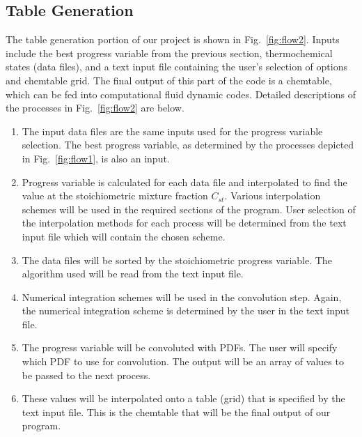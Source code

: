 \documentclass[11pt]{article}
\begin{document}
 
\subsection{Table Generation}
The table generation portion of our project is shown in
Fig.~\ref{fig:flow2}.  Inputs include the best progress variable from
the previous section, thermochemical states (data files), and a text
input file containing the user's selection of options and chemtable
grid.  The final output of this part of the code is a chemtable, which
can be fed into computational fluid dynamic codes.  Detailed
descriptions of the processes in Fig.~\ref{fig:flow2} are below.


\begin{enumerate}
\item The input data files are the same inputs used for the progress
  variable selection. The best progress variable, as determined by the
  processes depicted in Fig.~\ref{fig:flow1}, is also an input.
\item Progress variable is calculated for each data file and
  interpolated to find the value at the stoichiometric mixture
  fraction $C_{st}$. Various interpolation schemes will be used in the
  required sections of the program.
  User selection of the interpolation methods for each process will be
  determined from the text input file which will contain the chosen
  scheme.
\item The data files will be sorted by the stoichiometric progress
  variable.
  The algorithm used will be read from the text input file.
\item Numerical integration schemes will be used in the convolution
  step.
  Again, the numerical integration scheme is determined by the user in
  the text input file.
\item The progress variable will be convoluted with PDFs. The user
  will specify which PDF to use for convolution.
  The output will be an array of values to be passed to the next
  process.
\item These values will be interpolated onto a table (grid) that is
  specified by the text input file.  This is the chemtable that will
  be the final output of our program.
\end{enumerate}
\end{document}

